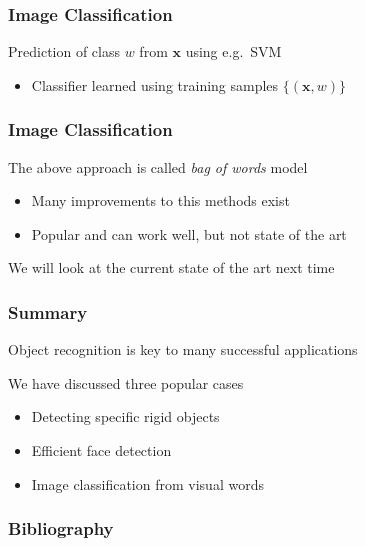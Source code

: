 \documentclass[xetex,professionalfont]{beamer}
\renewcommand{\vec}[1]{\ensuremath{\mathbf{#1}}}
\newcommand{\vx}{\vec{x}}
\begin{document}

\begin{frame}
\frametitle{Image Classification}

Prediction of class $w$ from $\vx$ using e.g.\ SVM %
\begin{itemize}
    \item Classifier learned using training samples $\{(\vx,w)\}$
\end{itemize}

\bigskip
\begin{center}
\end{center}

\end{frame}


\begin{frame}
\frametitle{Image Classification}

The above approach is called \emph{bag of words} model
\begin{itemize}
    \item Many improvements to this methods exist
    \item Popular and can work well, but not state of the art %
\end{itemize}

\bigskip
We will look at the current state of the art next time

\end{frame}


\begin{frame}
\frametitle{Summary}

Object recognition is key to many successful applications

\bigskip
We have discussed three popular cases
\begin{itemize}
    \item Detecting specific rigid objects
    \item Efficient face detection
    \item Image classification from visual words
\end{itemize}

\end{frame}


\begin{frame}[allowframebreaks=0.8]
\frametitle{Bibliography}

\printbibliography

\end{frame}
\end{document}
